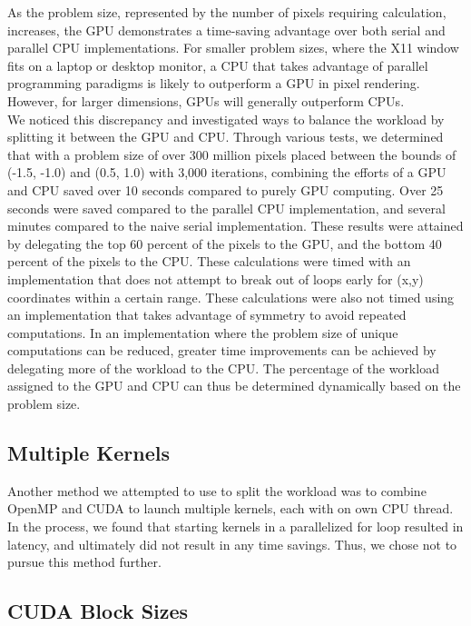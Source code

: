 \documentclass{article}
\begin{document}
As the problem size, represented by the number of pixels requiring calculation, increases, the GPU demonstrates a time-saving advantage over both serial and parallel CPU implementations.
For smaller problem sizes, where the X11 window fits on a laptop or desktop monitor, a CPU that takes advantage of parallel programming paradigms is likely to outperform a GPU in pixel rendering.
However, for larger dimensions, GPUs will generally outperform CPUs.\\

We noticed this discrepancy and investigated ways to balance the workload by splitting it between the GPU and CPU.
Through various tests, we determined that with a problem size of over 300 million pixels placed between the bounds of (-1.5, -1.0) and (0.5, 1.0) with 3,000 iterations, combining the efforts of a GPU and CPU saved over 10 seconds compared to purely GPU computing.
Over 25 seconds were saved compared to the parallel CPU implementation, and several minutes compared to the naive serial implementation.
These results were attained by delegating the top 60 percent of the pixels to the GPU, and the bottom 40 percent of the pixels to the CPU.
These calculations were timed with an implementation that does not attempt to break out of loops early for (x,y) coordinates within a certain range.
These calculations were also not timed using an implementation that takes advantage of symmetry to avoid repeated computations.
In an implementation where the problem size of unique computations can be reduced, greater time improvements can be achieved by delegating more of the workload to the CPU.
The percentage of the workload assigned to the GPU and CPU can thus be determined dynamically based on the problem size.

\subsection{Multiple Kernels}

Another method we attempted to use to split the workload was to combine OpenMP and CUDA to launch multiple kernels, each with on own CPU thread.
In the process, we found that starting kernels in a parallelized for loop resulted in latency, and ultimately did not result in any time savings.
Thus, we chose not to pursue this method further.

\subsection{CUDA Block Sizes}
\end{document}
